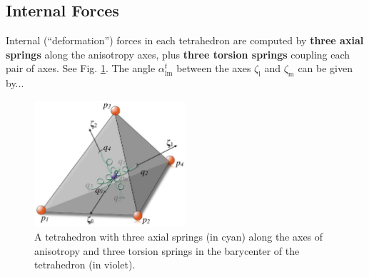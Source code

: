 \documentclass{article}
\begin{document}
\subsection{Internal Forces}

Internal (“deformation”) forces in each tetrahedron are computed by \textbf{three axial springs} along the anisotropy axes, plus \textbf{three torsion springs} coupling each pair of axes. See Fig. \ref{fig:springs}. The angle $\alpha_{\mathrm{lm}}^{t}$ between the axes $\zeta_{\mathrm{l}}$ and $\zeta_{\mathrm{m}}$ can be given by... %

\begin{figure}[ht!]
    \centering
    \includegraphics[width=0.5\textwidth]{images/fig2.12.jpg}
    \caption{A tetrahedron with three axial springs (in cyan) along the axes of anisotropy and three torsion springs in the barycenter of the tetrahedron (in violet).}
    \label{fig:springs}
\end{figure}
\end{document}
